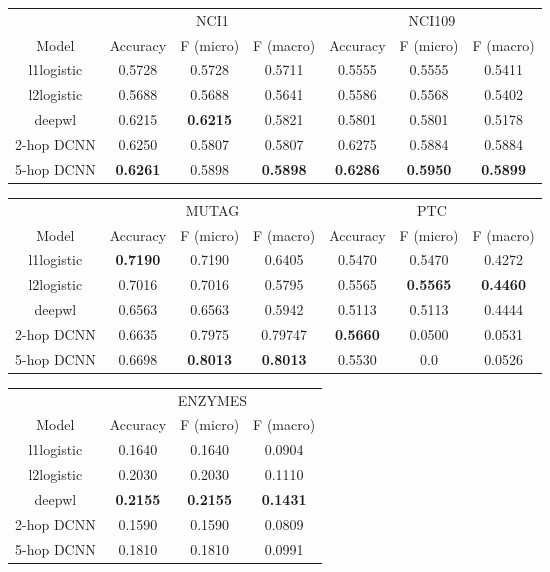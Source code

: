 \documentclass{article}
\begin{document}
\begin{table}[h]

    \begin{tabular}{c|c|c|c||c|c|c|}
         \cline{2-7}
         & \multicolumn{3}{c||}{NCI1} & \multicolumn{3}{c|}{NCI109} \\
         \cline{2-7}
         Model & Accuracy & F (micro) & F (macro) & Accuracy & F (micro) & F (macro) \\
         \hline
         l1logistic &  0.5728 & 0.5728 & 0.5711 & 0.5555 & 0.5555 & 0.5411 \\
         l2logistic & 0.5688 & 0.5688 & 0.5641 & 0.5586 & 0.5568 & 0.5402 \\
         deepwl & 0.6215 & \textbf{0.6215} & 0.5821 & 0.5801 & 0.5801 & 0.5178 \\
         2-hop DCNN & 0.6250 & 0.5807 & 0.5807 &  0.6275 & 0.5884 & 0.5884 \\
         5-hop DCNN & \textbf{0.6261} & 0.5898 & \textbf{0.5898} & \textbf{0.6286} & \textbf{0.5950} & \textbf{0.5899} \\
         \hline 
    \end{tabular}
    \begin{tabular}{c|c|c|c||c|c|c|}
         \cline{2-7}
         & \multicolumn{3}{c||}{MUTAG} & \multicolumn{3}{c|}{PTC} \\
         \cline{2-7}
         Model & Accuracy & F (micro) & F (macro) & Accuracy & F (micro) & F (macro) \\
         \hline
         l1logistic &  \textbf{0.7190} & 0.7190 & 0.6405 & 0.5470 & 0.5470 & 0.4272 \\
         l2logistic & 0.7016 & 0.7016 & 0.5795 & 0.5565 & \textbf{0.5565} & \textbf{0.4460} \\
         deepwl & 0.6563 & 0.6563 & 0.5942 & 0.5113 & 0.5113 & 0.4444 \\
         2-hop DCNN & 0.6635 & 0.7975 & 0.79747 & \textbf{0.5660} & 0.0500 & 0.0531 \\
         5-hop DCNN & 0.6698 & \textbf{0.8013} & \textbf{0.8013}  & 0.5530 & 0.0 & 0.0526 \\
         \hline 
    \end{tabular}
    
     \begin{tabular}{c|c|c|c|}
        \cline{2-4}
         & \multicolumn{3}{c|}{ENZYMES} \\
         \cline{2-4}
         Model & Accuracy & F (micro) & F (macro) \\
         \hline
         l1logistic &  0.1640 & 0.1640 & 0.0904 \\
         l2logistic &  0.2030 & 0.2030 & 0.1110 \\
         deepwl & \textbf{0.2155} & \textbf{0.2155} & \textbf{0.1431} \\
         2-hop DCNN & 0.1590 & 0.1590 & 0.0809 \\
         5-hop DCNN & 0.1810 & 0.1810 & 0.0991 \\
         \hline 
    \end{tabular}
    

\end{table}
\end{document}
